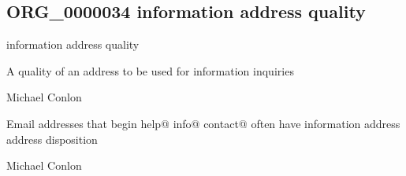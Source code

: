 \documentclass[letterpaper,10pt,english]{sphinxmanual}
\begin{document}
\subsection{ORG\_0000034 \sphinxhyphen{} information address quality}
\label{\detokenize{doc-ORG_0000034:org-0000034-information-address-quality}}\label{\detokenize{doc-ORG_0000034:index-0}}\label{\detokenize{doc-ORG_0000034::doc}}
\begin{sphinxShadowBox}

\sphinxAtStartPar
information address quality
\end{sphinxShadowBox}

\begin{sphinxShadowBox}

\sphinxAtStartPar
{\hyperref[\detokenize{doc-BFO_0000019::doc}]{}}
\end{sphinxShadowBox}

\begin{sphinxShadowBox}

\sphinxAtStartPar
A quality of an address to be used for information inquiries
\end{sphinxShadowBox}

\begin{sphinxShadowBox}

\sphinxAtStartPar
Michael Conlon 
\end{sphinxShadowBox}

\begin{sphinxShadowBox}

\sphinxAtStartPar
Email addresses that begin help@ info@ contact@ often have information address address disposition
\end{sphinxShadowBox}

\begin{sphinxShadowBox}

\sphinxAtStartPar
Michael Conlon 
\end{sphinxShadowBox}
\begin{quote}

\ignorespaces \end{quote}
\end{document}
